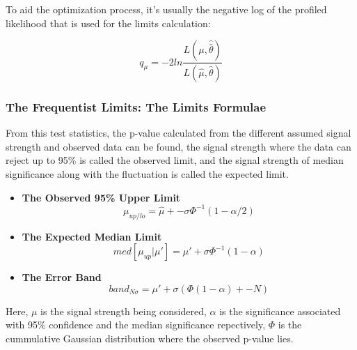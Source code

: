 To aid the optimization process, it's usually the negative log of the profiled likelihood that is used for the limits calculation:

\begin{equation}
    q_{\mu} = -2 ln \frac{L(\mu, \hat{\hat{\theta}})}{L(\hat{\mu}, \hat{\theta})}
\label{teststats}
\end{equation}


\subsubsection{The Frequentist Limits: The Limits Formulae}
\label{sec:limits}

From this test statistics, the p-value calculated from the different assumed signal strength and observed data can be found, the signal strength where the data can reject up to 95\% is called the observed limit, and the signal strength of median significance along with the fluctuation is called the expected limit. 

\begin{itemize}


\item \textbf{The Observed 95\% Upper Limit}
\begin{equation}
\mu_{up/lo} = \hat{\mu} +- \sigma\Phi^{-1}(1-\alpha/2)
\end{equation}

\item \textbf{The Expected Median Limit}
\begin{equation}
    med[\mu_{up}|\mu'] = \mu' + \sigma\Phi^{-1}(1-\alpha) 
\end{equation}

\item \textbf{The Error Band}
\begin{equation}
    band_{N\sigma} = \mu' + \sigma(\Phi(1-\alpha)+-N)
\end{equation}

\end{itemize}


Here, $\mu$ is the signal strength being considered, $\alpha$ is the significance associated with 95$\%$ confidence and the median significance repectively, $\Phi$ is the cummulative Gaussian distribution where the observed p-value lies.

